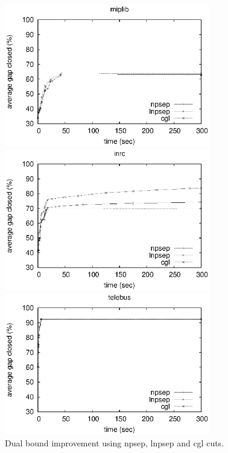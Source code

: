 \documentclass{endm}
\begin{document}
\begin{figure}	
	\begin{minipage}[h]{.5\textwidth}
		\begin{center}
			\includegraphics[width=0.8\textwidth]{miplib.eps}
		\end{center}
	\end{minipage}
	\begin{minipage}[h]{.5\textwidth}
		\begin{center}
			\includegraphics[width=0.8\textwidth]{nurse.eps}
		\end{center}
	\end{minipage}
	\begin{minipage}[h]{.5\textwidth}
		\begin{center}
			\includegraphics[width=0.8\textwidth]{telebus.eps}
		\end{center}
	\end{minipage}
	\caption{Dual bound improvement using npsep, lnpsep and cgl cuts.}
	\label{figExperiments}
\end{figure}
\end{document}
